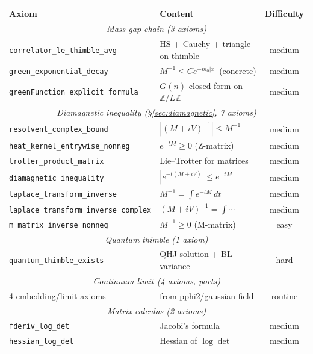 \documentclass[12pt]{article}
\theoremstyle{definition}
\theoremstyle{remark}
\newcommand{\Z}{\mathbb{Z}}
\begin{document}
\begin{center}
\begin{tabular}{|l|l|c|}
\hline
\textbf{Axiom} & \textbf{Content} & \textbf{Difficulty} \\
\hline
\multicolumn{3}{|c|}{\emph{Mass gap chain (3 axioms)}} \\
\hline
\texttt{correlator\_le\_thimble\_avg} & HS + Cauchy + triangle on thimble
  & medium \\
\texttt{green\_exponential\_decay} & $M^{-1} \le Ce^{-m_0|x|}$ (concrete)
  & medium \\
\texttt{greenFunction\_explicit\_formula} & $G(n)$ closed form on $\Z/L\Z$
  & medium \\
\hline
\multicolumn{3}{|c|}{\emph{Diamagnetic inequality (\S\ref{sec:diamagnetic}, 7 axioms)}} \\
\hline
\texttt{resolvent\_complex\_bound} & $|(M{+}iV)^{-1}| \le M^{-1}$
  & medium \\
\texttt{heat\_kernel\_entrywise\_nonneg} & $e^{-tM} \ge 0$ (Z-matrix)
  & medium \\
\texttt{trotter\_product\_matrix} & Lie--Trotter for matrices
  & medium \\
\texttt{diamagnetic\_inequality} & $|e^{-t(M{+}iV)}| \le e^{-tM}$
  & medium \\
\texttt{laplace\_transform\_inverse} & $M^{-1} = \int e^{-tM}\,dt$
  & medium \\
\texttt{laplace\_transform\_inverse\_complex} & $(M{+}iV)^{-1} = \int\cdots$
  & medium \\
\texttt{m\_matrix\_inverse\_nonneg} & $M^{-1} \ge 0$ (M-matrix)
  & easy \\
\hline
\multicolumn{3}{|c|}{\emph{Quantum thimble (1 axiom)}} \\
\hline
\texttt{quantum\_thimble\_exists} & QHJ solution + BL variance
  & hard \\
\hline
\multicolumn{3}{|c|}{\emph{Continuum limit (4 axioms, ports)}} \\
\hline
4 embedding/limit axioms & from pphi2/gaussian-field
  & routine \\
\hline
\multicolumn{3}{|c|}{\emph{Matrix calculus (2 axioms)}} \\
\hline
\texttt{fderiv\_log\_det} & Jacobi's formula
  & medium \\
\texttt{hessian\_log\_det} & Hessian of $\log\det$
  & medium \\
\hline
\end{tabular}
\end{center}
\end{document}
